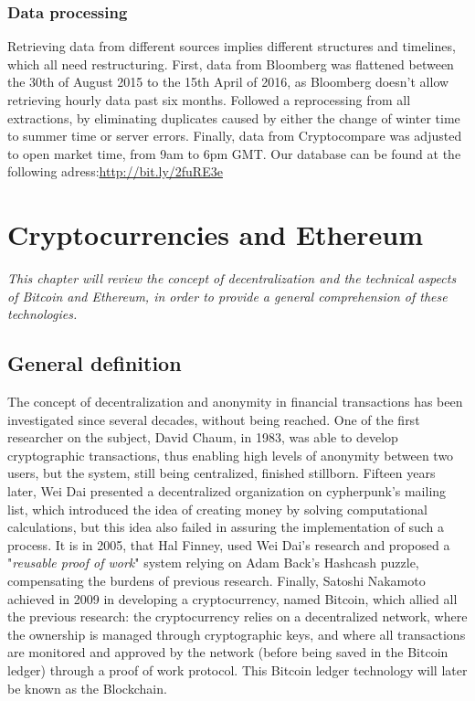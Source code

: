 \documentclass[11pt]{report}
\begin{document}
\subsection*{Data processing}

Retrieving data from different sources implies different structures and timelines, which all need restructuring. 
First, data from Bloomberg was flattened between the 30th of August 2015 to the 15th April of 2016, as Bloomberg doesn’t allow retrieving hourly data past six months. Followed a reprocessing from all extractions, by eliminating duplicates caused by either the change of winter time to summer time or server errors. Finally, data from Cryptocompare was adjusted to open market time, from 9am to 6pm GMT. \medbreak
Our database can be found at the following adress:\newline \url{http://bit.ly/2fuRE3e}

	
\chapter{Cryptocurrencies and Ethereum }
	\begin{flushright}
	\textit{This chapter will review the concept of decentralization and the technical aspects of Bitcoin and Ethereum, in order to provide a general comprehension of these technologies.}
	\end{flushright}
	 \section{General definition}
	The concept of decentralization and anonymity in financial transactions has been investigated since several decades, without being reached. \smallbreak
One of the first researcher on the subject, David Chaum\cite{CHAUM}, in 1983, was able to develop cryptographic transactions, thus enabling high levels of anonymity between two users, but the system, still being centralized, finished stillborn. Fifteen years later, Wei Dai presented a decentralized organization on cypherpunk's mailing list, which introduced the idea of creating money by solving computational calculations, but this idea also failed in assuring the implementation of such a process. It is in 2005, that Hal Finney, used Wei Dai’s research and proposed a "\textit{reusable proof of work}" system relying on Adam Back's Hashcash\cite{ADAM} puzzle, compensating the burdens of previous research.\newline
Finally, Satoshi Nakamoto achieved in 2009 in developing a cryptocurrency, named Bitcoin\cite{SATOSHI}, which allied all the previous research: the cryptocurrency relies on a decentralized network, where the ownership is managed through cryptographic keys, and where all transactions are monitored and approved by the network (before being saved in the Bitcoin ledger) through a proof of work protocol.\cite{BUTERIN}\newline
This Bitcoin ledger technology will later be known as the Blockchain.
\end{document}
